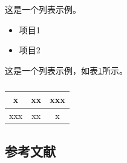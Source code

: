 这是一个列表示例。

\begin{itemize}
    \item 项目1
    \item 项目2
\end{itemize}

这是一个列表示例，如表\ref{tab:exp}所示。

\begin{table}[htbp]
    \centering
    \caption{}
    \label{tab:exp}
    \begin{tabular}{|c|c|c|}
        \hline
        x & xx & xxx \\
        \hline
        xxx & xx & x \\
        \hline
    \end{tabular}
\end{table}

{
\newpage

\subsection{参考文献}
{\normalfont{}\setlength{\baselineskip}{14pt}
\renewcommand{\refname}{\vspace{-\baselineskip}}
}
}